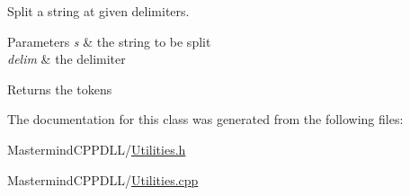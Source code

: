 Split a string at given delimiters. 


\begin{DoxyParams}{Parameters}
{\em s} & the string to be split \\
\hline
{\em delim} & the delimiter \\
\hline
\end{DoxyParams}
\begin{DoxyReturn}{Returns}
the tokens 
\end{DoxyReturn}


The documentation for this class was generated from the following files\+:\begin{DoxyCompactItemize}
\item 
Mastermind\+C\+P\+P\+D\+L\+L/\hyperlink{_utilities_8h}{Utilities.\+h}\item 
Mastermind\+C\+P\+P\+D\+L\+L/\hyperlink{_utilities_8cpp}{Utilities.\+cpp}\end{DoxyCompactItemize}
